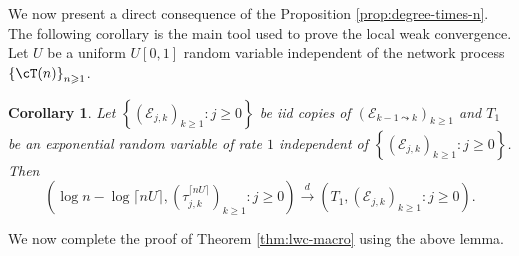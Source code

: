 \documentclass[letterpaper,11pt,reqno]{amsart}
\newtheorem{cor}[thm]{Corollary}
\theoremstyle{definition}
\renewcommand{\geq}{\geqslant}
\newcommand{\set}[1]{\left\{#1\right\}}
\newcommand{\sE}{\mathscr{E}}
\newcommand{\convd}{\stackrel{d}{\longrightarrow}}
\begin{document}
We now present a direct consequence of the Proposition \ref{prop:degree-times-n}. The following corollary is the main tool used to prove the local weak convergence. Let $U$ be a uniform $U[0,1]$ random variable independent of the network process $\set{\cT(n)}_{n\geq 1}$. 


\begin{cor}
\label{cor:degree-times-uniform}
   Let $\set{\left(\sE_{j,k}\right)_{k\geq 1}:j\geq 0}$ be \emph{iid} copies of $\left(\sE_{k-1\leadsto k}\right)_{k\geq 1}$ and $T_1$ be an exponential random variable of rate $1$ independent of $\set{\left(\sE_{j,k}\right)_{k\geq 1}:j\geq 0}$. Then 
    \begin{equation*}
        \left(\log n - \log \lceil n U\rceil,\left(\tau_{j,k}^{\lceil nU \rceil}\right)_{k\geq 1}: j\geq 0 \right) \convd \left(T_1,\left(\sE_{j,k}\right)_{k\geq 1}:j\geq 0 \right).
    \end{equation*}
\end{cor}


We now complete the proof of Theorem \ref{thm:lwc-macro} using the above lemma. 
\end{document}
